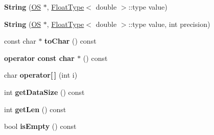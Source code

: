 \begin{DoxyCompactItemize}
\item 
{\bfseries String} (\hyperlink{class_object_script_1_1_o_s}{OS} $\ast$, \hyperlink{struct_object_script_1_1_float_type}{Float\+Type}$<$ double $>$\+::type value)\hypertarget{class_object_script_1_1_o_s_1_1_core_1_1_string_a1eb22521234e06cd1724b0597ec5b72e}{}\label{class_object_script_1_1_o_s_1_1_core_1_1_string_a1eb22521234e06cd1724b0597ec5b72e}

\item 
{\bfseries String} (\hyperlink{class_object_script_1_1_o_s}{OS} $\ast$, \hyperlink{struct_object_script_1_1_float_type}{Float\+Type}$<$ double $>$\+::type value, int precision)\hypertarget{class_object_script_1_1_o_s_1_1_core_1_1_string_a54a498cffa4207ffe7844deb057971c3}{}\label{class_object_script_1_1_o_s_1_1_core_1_1_string_a54a498cffa4207ffe7844deb057971c3}

\item 
const char $\ast$ {\bfseries to\+Char} () const \hypertarget{class_object_script_1_1_o_s_1_1_core_1_1_string_a54d07423380b52ba50aadbc7048f68f9}{}\label{class_object_script_1_1_o_s_1_1_core_1_1_string_a54d07423380b52ba50aadbc7048f68f9}

\item 
{\bfseries operator const char $\ast$} () const \hypertarget{class_object_script_1_1_o_s_1_1_core_1_1_string_a2683f2e53f0c32b17eadc0a12e96acbe}{}\label{class_object_script_1_1_o_s_1_1_core_1_1_string_a2683f2e53f0c32b17eadc0a12e96acbe}

\item 
char {\bfseries operator\mbox{[}$\,$\mbox{]}} (int i)\hypertarget{class_object_script_1_1_o_s_1_1_core_1_1_string_a661ca41b458354ca08e93da2fdcbabb1}{}\label{class_object_script_1_1_o_s_1_1_core_1_1_string_a661ca41b458354ca08e93da2fdcbabb1}

\item 
int {\bfseries get\+Data\+Size} () const \hypertarget{class_object_script_1_1_o_s_1_1_core_1_1_string_ab064e00bd91f295fd915c07d6a48a986}{}\label{class_object_script_1_1_o_s_1_1_core_1_1_string_ab064e00bd91f295fd915c07d6a48a986}

\item 
int {\bfseries get\+Len} () const \hypertarget{class_object_script_1_1_o_s_1_1_core_1_1_string_a88c74f0e507194e3dd0fd2e23f19c231}{}\label{class_object_script_1_1_o_s_1_1_core_1_1_string_a88c74f0e507194e3dd0fd2e23f19c231}

\item 
bool {\bfseries is\+Empty} () const \hypertarget{class_object_script_1_1_o_s_1_1_core_1_1_string_a8df0f5c3481e04edbdae746c2fbb5d08}{}\label{class_object_script_1_1_o_s_1_1_core_1_1_string_a8df0f5c3481e04edbdae746c2fbb5d08}


\end{DoxyCompactItemize}
